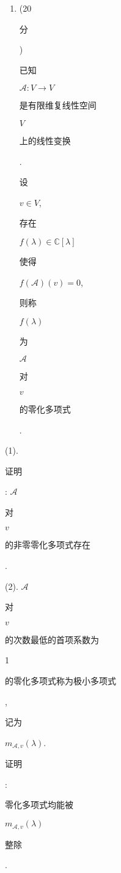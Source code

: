 \documentclass[10pt]{article}
\begin{document}
\begin{enumerate}
  \item (20 \begin{CJK}{UTF8}{mj}分\end{CJK}) \begin{CJK}{UTF8}{mj}已知\end{CJK} $\mathscr{A}: V \rightarrow V$ \begin{CJK}{UTF8}{mj}是有限维复线性空间\end{CJK} $V$ \begin{CJK}{UTF8}{mj}上的线性变换\end{CJK}. \begin{CJK}{UTF8}{mj}设\end{CJK} $v \in V$, \begin{CJK}{UTF8}{mj}存在\end{CJK} $f(\lambda) \in \mathbb{C}[\lambda]$ \begin{CJK}{UTF8}{mj}使得\end{CJK} $f(\mathscr{A})(v)=0$, \begin{CJK}{UTF8}{mj}则称\end{CJK} $f(\lambda)$ \begin{CJK}{UTF8}{mj}为\end{CJK} $\mathscr{A}$ \begin{CJK}{UTF8}{mj}对\end{CJK} $v$ \begin{CJK}{UTF8}{mj}的零化多项式\end{CJK}.

\end{enumerate}
(1). \begin{CJK}{UTF8}{mj}证明\end{CJK}: $\mathscr{A}$ \begin{CJK}{UTF8}{mj}对\end{CJK} $v$ \begin{CJK}{UTF8}{mj}的非零零化多项式存在\end{CJK}.

(2). $\mathscr{A}$ \begin{CJK}{UTF8}{mj}对\end{CJK} $v$ \begin{CJK}{UTF8}{mj}的次数最低的首项系数为\end{CJK} 1 \begin{CJK}{UTF8}{mj}的零化多项式称为极小多项式\end{CJK}, \begin{CJK}{UTF8}{mj}记为\end{CJK} $m_{\mathscr{A}, v}(\lambda)$. \begin{CJK}{UTF8}{mj}证明\end{CJK}: \begin{CJK}{UTF8}{mj}零化多项式均能被\end{CJK} $m_{\mathscr{A}, v}(\lambda)$ \begin{CJK}{UTF8}{mj}整除\end{CJK}.
\end{document}
